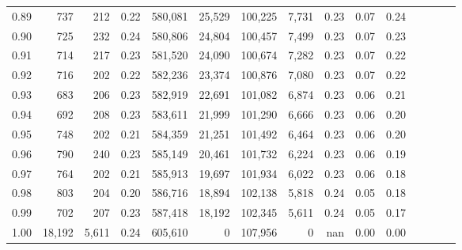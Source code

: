 \begin{tabular}{rrrcrrrrrrrrrrr}
0.89 &     737 &    212 &                                       0.22 &  580,081 &   25,529 &  100,225 &    7,731 &  0.23 &  0.07 &                         0.24 \\
0.90 &     725 &    232 &                                       0.24 &  580,806 &   24,804 &  100,457 &    7,499 &  0.23 &  0.07 &                         0.23 \\
0.91 &     714 &    217 &                                       0.23 &  581,520 &   24,090 &  100,674 &    7,282 &  0.23 &  0.07 &                         0.22 \\
0.92 &     716 &    202 &                                       0.22 &  582,236 &   23,374 &  100,876 &    7,080 &  0.23 &  0.07 &                         0.22 \\
0.93 &     683 &    206 &                                       0.23 &  582,919 &   22,691 &  101,082 &    6,874 &  0.23 &  0.06 &                         0.21 \\
0.94 &     692 &    208 &                                       0.23 &  583,611 &   21,999 &  101,290 &    6,666 &  0.23 &  0.06 &                         0.20 \\
0.95 &     748 &    202 &                                       0.21 &  584,359 &   21,251 &  101,492 &    6,464 &  0.23 &  0.06 &                         0.20 \\
0.96 &     790 &    240 &                                       0.23 &  585,149 &   20,461 &  101,732 &    6,224 &  0.23 &  0.06 &                         0.19 \\
0.97 &     764 &    202 &                                       0.21 &  585,913 &   19,697 &  101,934 &    6,022 &  0.23 &  0.06 &                         0.18 \\
0.98 &     803 &    204 &                                       0.20 &  586,716 &   18,894 &  102,138 &    5,818 &  0.24 &  0.05 &                         0.18 \\
0.99 &     702 &    207 &                                       0.23 &  587,418 &   18,192 &  102,345 &    5,611 &  0.24 &  0.05 &                         0.17 \\
1.00 &  18,192 &  5,611 &                                       0.24 &  605,610 &        0 &  107,956 &        0 &   nan &  0.00 &                         0.00 \\
\bottomrule
\end{tabular}

